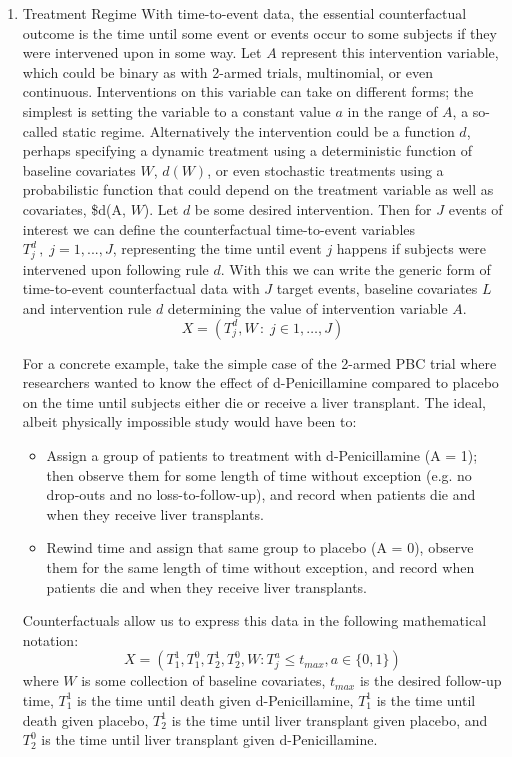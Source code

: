 \documentclass{report}
\newcommand{\1}{\ensuremath{\mathbf{1}}}
\renewcommand{\L}{\ensuremath{W}}
\begin{document}
\begin{enumerate}
\item Treatment Regime
\label{TreatmentRegime}
With time-to-event data, the essential counterfactual outcome is the time until some event or events occur to some subjects if they were intervened upon in some way. Let \(A\) represent this intervention variable, which could be binary as with 2-armed trials, multinomial, or even continuous. Interventions on this variable can take on different forms; the simplest is setting the variable to a constant value \(a\) in the range of \(A\), a so-called static regime. Alternatively the intervention could be a function \(d\), perhaps specifying a dynamic treatment using a deterministic function of baseline covariates \(\L\), \(d(\L)\), or even stochastic treatments using a probabilistic function that could depend on the treatment variable as well as covariates, \$d(A, \L). Let \(d\) be some desired intervention. Then for \(J\) events of interest we can define the counterfactual time-to-event variables \(T^d_j \,,\; j = 1, ..., J\), representing the time until event \(j\) happens if subjects were intervened upon following rule \(d\). With this we can write the generic form of time-to-event counterfactual data with \(J\) target events, baseline covariates \(L\) and intervention rule \(d\) determining the value of intervention variable \(A\).
\[ X = \left( T^d_j, \L \,:\; j \in 1, \dots, J \right)\]

For a concrete example, take the simple case of the 2-armed PBC trial where researchers wanted to know the effect of d-Penicillamine compared to placebo on the time until subjects either die or receive a liver transplant. The ideal, albeit physically impossible study would have been to:
\begin{itemize}
\item Assign a group of patients to treatment with d-Penicillamine (A = 1); then observe them for some length of time without exception (e.g. no drop-outs and no loss-to-follow-up), and record when patients die and when they receive liver transplants.
\item Rewind time and assign that same group to placebo (A = 0), observe them for the same length of time without exception, and record when patients die and when they receive liver transplants.
\end{itemize}

Counterfactuals allow us to express this data in the following mathematical notation:
\[ X = (T^1_1, T^0_1, T^1_2, T^0_2, \L : T^a_j \leq t_{max},  a \in \{0, 1\}) \]
where \(\L\) is some collection of baseline covariates, \(t_{max}\) is the desired follow-up time, \(T^1_1\) is the time until death given d-Penicillamine, \(T^1_1\) is the time until death given placebo, \(T^1_2\) is the time until liver transplant given placebo, and \(T^0_2\) is the time until liver transplant given d-Penicillamine.


\end{enumerate}
\end{document}
